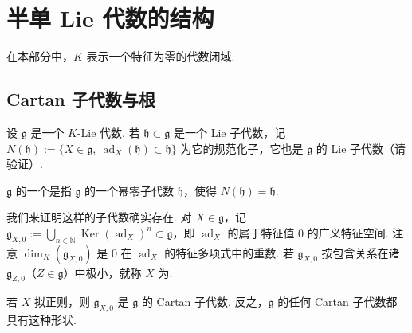 \chapter{半单 Lie 代数的结构}\label{chap:ssl-3}
\enlargethispage{1pt}%
在本部分中，$K$ 表示一个特征为零的代数闭域.

\section{Cartan 子代数与根}\label{sec:ssl-3-1}
设 $\mathfrak g$ 是一个 $K$-Lie 代数. 若 $\mathfrak h\subset\mathfrak g$ 是一个 Lie 子代数，记 $N(\mathfrak h):=\{X\in\mathfrak g,\ \operatorname{ad}_X(\mathfrak h)\subset\mathfrak h\}$ 为它的规范化子，它也是 $\mathfrak g$ 的 Lie 子代数（请验证）.
\begin{definition*}
$\mathfrak g$ 的一个是指 $\mathfrak g$ 的一个幂零子代数 $\mathfrak h$，使得 $N(\mathfrak h)=\mathfrak h$.
\end{definition*}
我们来证明这样的子代数确实存在. 对 $X\in\mathfrak g$，记 $\mathfrak g_{X,0}:=\bigcup_{n\in\mathbb N}\operatorname{Ker}(\operatorname{ad}_X)^n\subset\mathfrak g$，即 $\operatorname{ad}_X$ 的属于特征值 $0$ 的广义特征空间. 注意 $\dim_K(\mathfrak g_{X,0})$ 是 $0$ 在 $\operatorname{ad}_X$ 的特征多项式中的重数. 若 $\mathfrak g_{X,0}$ 按包含关系在诸 $\mathfrak g_{Z,0}$（$Z\in\mathfrak g$）中极小，就称 $X$ 为.
\begin{proposition*}
若 $X$ 拟正则，则 $\mathfrak g_{X,0}$ 是 $\mathfrak g$ 的 Cartan 子代数. 反之，$\mathfrak g$ 的任何 Cartan 子代数都具有这种形状.
\end{proposition*}
